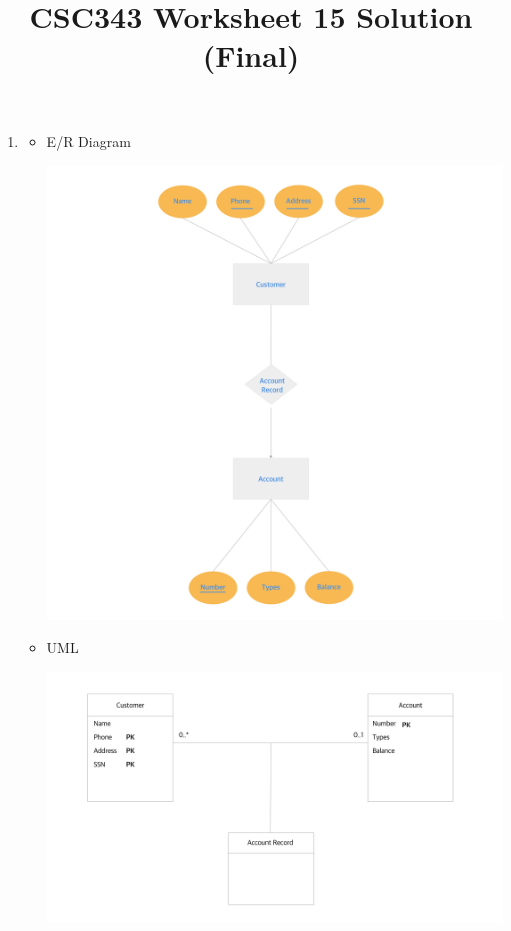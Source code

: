 \documentclass[12pt]{article}
\begin{document}
\title{CSC343 Worksheet 15 Solution (Final)}
\maketitle

\begin{enumerate}[1.]
    \item

    \begin{itemize}
        \item E/R Diagram

        \begin{center}
        \includegraphics[width=0.7\linewidth]{images/worksheet_15_solution_9.png}
        \end{center}

        \item UML

        \begin{center}
        \includegraphics[width=\linewidth]{images/worksheet_15_solution_10.png}
        \end{center}



\end{itemize}
\end{enumerate}
\end{document}
